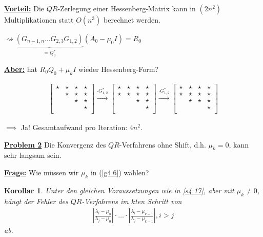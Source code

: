 \documentclass{book}
\newtheorem{corollary}[algorithm]{Korollar}
\begin{document}
            \underline{\textbf{Vorteil:}} Die $QR$-Zerlegung einer Hessenberg-Matrix kann in $(2n^2)$ Multiplikationen 
            statt $O(n^3)$ berechnet werden.
            
            $\rightsquigarrow \underbrace{(G_{n-1,n}\dots G_{2,3}G_{1,2})}_{=Q_0^*}(A_0-\mu_0 I)=R_0$

            \underline{\textbf{Aber:}} hat $R_0Q_0+\mu_k I$ wieder Hessenberg-Form?

            \begin{align*}
                \begin{bmatrix}
                    \star & \star & \star & \star \\
                     & \star & \star & \star \\
                    & & \star & \star \\
                    & & & \star \\
                \end{bmatrix}\stackrel{\cdot G_{1,2}^*}{\to} 
                \begin{bmatrix}
                    \star & \star & \star & \star \\
                    \star & \star & \star & \star \\
                    & & \star & \star \\
                    & & & \star \\
                \end{bmatrix}\stackrel{\cdot G_{1,2}^*}{\to} 
                \begin{bmatrix}
                    \star & \star & \star & \star \\
                    \star & \star & \star & \star \\
                    & \star & \star & \star \\
                    & & & \star \\
                \end{bmatrix}
            \end{align*}

            $\implies$ Ja! Gesamtaufwand pro Iteration: $4n^2$.

            \underline{\textbf{Problem 2}} Die Konvergenz des $QR$-Verfahrens ohne Shift, d.h. $\mu_k=0$,
            kann sehr langsam sein.

            \underline{\textbf{Frage:}} Wie müssen wir $\mu_k$ in (\ref{g4.6}) wählen?

            \begin{corollary}\label{k4.19}
                Unter den gleichen Voraussetzungen wie in \ref{s4.17}, aber mit $\mu_k\neq 0$, hängt 
                der Fehler des $QR$-Verfahrens im $k$ten Schritt von
                \begin{align*}
                    \left\vert \frac{\lambda_i-\mu_0}{\lambda_j-\mu_0} \right\vert\cdot \dots \cdot \left\vert \frac{\lambda_i-\mu_{k-1}}{\lambda_j-\mu_{k-1}} \right\vert,i>j
                \end{align*} 
                ab.
            \end{corollary}
\end{document}
